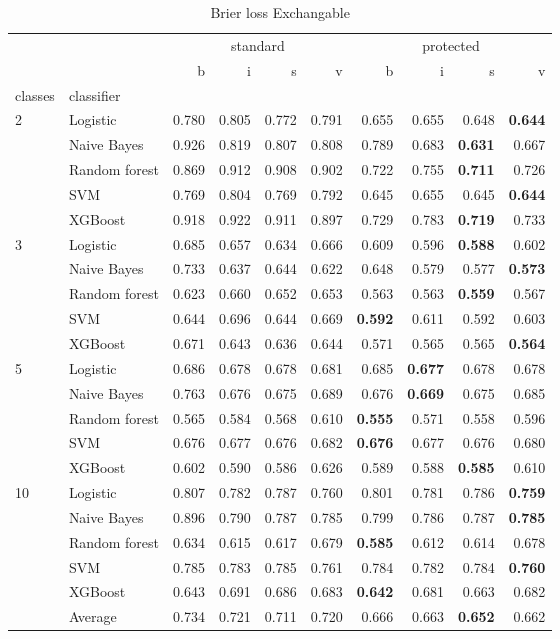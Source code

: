 \begin{table}
\caption{Brier loss Exchangable}
\begin{tabular}{l|l|rrrr|rrrr}
\toprule
 &  & \multicolumn{4}{c}{standard} & \multicolumn{4}{c}{protected} \\
 &  & b & i & s & v & b & i & s & v \\
classes & classifier &  &  &  &  &  &  &  &  \\
\midrule
\midrule
\multirow[c]{5}{*}{2} & Logistic & 0.780 & 0.805 & 0.772 & 0.791 & 0.655 & 0.655 & 0.648 & \textbf{0.644} \\
 & Naive Bayes & 0.926 & 0.819 & 0.807 & 0.808 & 0.789 & 0.683 & \textbf{0.631} & 0.667 \\
 & Random forest & 0.869 & 0.912 & 0.908 & 0.902 & 0.722 & 0.755 & \textbf{0.711} & 0.726 \\
 & SVM & 0.769 & 0.804 & 0.769 & 0.792 & 0.645 & 0.655 & 0.645 & \textbf{0.644} \\
 & XGBoost & 0.918 & 0.922 & 0.911 & 0.897 & 0.729 & 0.783 & \textbf{0.719} & 0.733 \\
\midrule
\multirow[c]{5}{*}{3} & Logistic & 0.685 & 0.657 & 0.634 & 0.666 & 0.609 & 0.596 & \textbf{0.588} & 0.602 \\
 & Naive Bayes & 0.733 & 0.637 & 0.644 & 0.622 & 0.648 & 0.579 & 0.577 & \textbf{0.573} \\
 & Random forest & 0.623 & 0.660 & 0.652 & 0.653 & 0.563 & 0.563 & \textbf{0.559} & 0.567 \\
 & SVM & 0.644 & 0.696 & 0.644 & 0.669 & \textbf{0.592} & 0.611 & 0.592 & 0.603 \\
 & XGBoost & 0.671 & 0.643 & 0.636 & 0.644 & 0.571 & 0.565 & 0.565 & \textbf{0.564} \\
\midrule
\multirow[c]{5}{*}{5} & Logistic & 0.686 & 0.678 & 0.678 & 0.681 & 0.685 & \textbf{0.677} & 0.678 & 0.678 \\
 & Naive Bayes & 0.763 & 0.676 & 0.675 & 0.689 & 0.676 & \textbf{0.669} & 0.675 & 0.685 \\
 & Random forest & 0.565 & 0.584 & 0.568 & 0.610 & \textbf{0.555} & 0.571 & 0.558 & 0.596 \\
 & SVM & 0.676 & 0.677 & 0.676 & 0.682 & \textbf{0.676} & 0.677 & 0.676 & 0.680 \\
 & XGBoost & 0.602 & 0.590 & 0.586 & 0.626 & 0.589 & 0.588 & \textbf{0.585} & 0.610 \\
\midrule
\multirow[c]{5}{*}{10} & Logistic & 0.807 & 0.782 & 0.787 & 0.760 & 0.801 & 0.781 & 0.786 & \textbf{0.759} \\
 & Naive Bayes & 0.896 & 0.790 & 0.787 & 0.785 & 0.799 & 0.786 & 0.787 & \textbf{0.785} \\
 & Random forest & 0.634 & 0.615 & 0.617 & 0.679 & \textbf{0.585} & 0.612 & 0.614 & 0.678 \\
 & SVM & 0.785 & 0.783 & 0.785 & 0.761 & 0.784 & 0.782 & 0.784 & \textbf{0.760} \\
 & XGBoost & 0.643 & 0.691 & 0.686 & 0.683 & \textbf{0.642} & 0.681 & 0.663 & 0.682 \\\midrule\ & Average & 0.734 & 0.721 & 0.711 & 0.720 & 0.666 & 0.663 & \textbf{0.652} & 0.662 \\
\bottomrule
\end{tabular}
\end{table}
